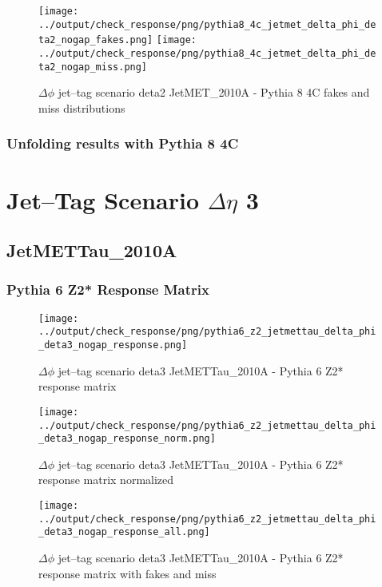 \documentclass[11pt]{book}
\begin{document}
\begin{figure}[ht]
\centering
\texttt{[image: ../output/check\_response/png/pythia8\_4c\_jetmet\_delta\_phi\_deta2\_nogap\_fakes.png]}
\texttt{[image: ../output/check\_response/png/pythia8\_4c\_jetmet\_delta\_phi\_deta2\_nogap\_miss.png]}
\caption{$\Delta\phi$ jet--tag scenario deta2 JetMET\_2010A - Pythia 8 4C fakes and miss distributions}
\label{p8_jetmet_delta_phi_deta2_nogap_fakesmiss}
\end{figure}


\clearpage
\subsection{Unfolding results with Pythia 8 4C}

\newpage
\chapter{Jet--Tag Scenario $\Delta\eta$ 3}
\section{JetMETTau\_2010A}
\subsection{Pythia 6 Z2* Response Matrix}

\begin{figure}[ht]
\centering
\texttt{[image: ../output/check\_response/png/pythia6\_z2\_jetmettau\_delta\_phi\_deta3\_nogap\_response.png]}
\caption{$\Delta\phi$ jet--tag scenario deta3 JetMETTau\_2010A - Pythia 6 Z2* response matrix}
\label{p6_jetmettau_delta_phi_deta3_nogap_response}
\end{figure}

\begin{figure}[ht]
\centering
\texttt{[image: ../output/check\_response/png/pythia6\_z2\_jetmettau\_delta\_phi\_deta3\_nogap\_response\_norm.png]}
\caption{$\Delta\phi$ jet--tag scenario deta3 JetMETTau\_2010A - Pythia 6 Z2* response matrix normalized}
\label{p6_jetmettau_delta_phi_deta3_nogap_response_norm}
\end{figure}

\begin{figure}[ht]
\centering
\texttt{[image: ../output/check\_response/png/pythia6\_z2\_jetmettau\_delta\_phi\_deta3\_nogap\_response\_all.png]}
\caption{$\Delta\phi$ jet--tag scenario deta3 JetMETTau\_2010A - Pythia 6 Z2* response matrix with fakes and miss}
\label{p6_jetmettau_delta_phi_deta3_nogap_response_all}
\end{figure}
\end{document}
